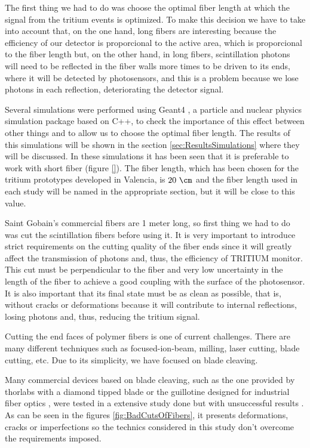 The first thing we had to do was choose the optimal fiber length at which the signal from the tritium events is optimized. To make this decision we have to take into account that, on the one hand, long fibers are interesting because the efficiency of our detector is proporcional to the active area, which is proporcional to the fiber length but, on the other hand, in long fibers, scintillation photons will need to be reflected in the fiber walls more times to be driven to its ends, where it will be detected by photosensors, and this is a problem because we lose photons in each reflection, deteriorating the detector signal.

Several simulations were performed using Geant4 \cite{Geant4WebPage}, a particle and nuclear physics simulation package based on C++, to check the importance of this effect between other things and to allow us to choose the optimal fiber length. The results of this simulations will be shown in the section \ref{sec:ResultsSimulations} where they will be discussed. In these simulations it has been seen that it is preferable to work with short fiber (figure \ref{}). The fiber length, which has been chosen for the tritium prototypes developed in Valencia, is $20~\cm$ and the fiber length used in each study will be named in the appropriate section, but it will be close to this value.

Saint Gobain's commercial fibers are 1 meter long, so first thing we had to do was cut the scintillation fibers before using it. It is very important to introduce strict requirements on the cutting quality of the fiber ends since it will greatly affect the transmission of photons and, thus, the efficiency of TRITIUM monitor. This cut must be perpendicular to the fiber and very low uncertainty in the length of the fiber to achieve a good coupling with the surface of the photosensor. It is also important that its final state must be as clean as possible, that is, without cracks or deformations because it will contribute to internal reflections, losing photons and, thus, reducing the tritium signal.

Cutting the end faces of polymer fibers is one of current challenges. There are many different techniques such as focused-ion-beam, milling, laser cutting, blade cutting, etc. Due to its simplicity, we have focused on blade cleaving. %

Many commercial devices based on blade cleaving, such as the one provided by thorlabs with a diamond tipped blade \cite{DiamondThorlabs} or the guillotine designed for industrial fiber optics \cite{GuillotineIFO}, were tested in a extensive study done but with unsuccessful results \cite{TFGAlberto}. As can be seen in the figures \ref{fig:BadCutsOfFibers}, it presents deformations, cracks or imperfections so the technics considered in this study don't overcome the requirements imposed.

